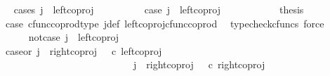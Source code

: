 \begin{isabellebody}
\ \ \isamarkupfalse%
{\isacharparenleft}{\kern0pt}cases\ {\isachardoublequoteopen}j\ {\isacharequal}{\kern0pt}\ left{\isacharunderscore}{\kern0pt}coproj\ {\isasymone}\ {\isacharparenleft}{\kern0pt}{\isasymone}\ {\isasymCoprod}\ {\isasymone}{\isacharparenright}{\kern0pt}{\isachardoublequoteclose}{\isacharparenright}{\kern0pt}\isanewline
\ \ \ \ \isamarkupfalse%
\ case{}{\isacharcolon}{\kern0pt}\ {\isachardoublequoteopen}j\ {\isacharequal}{\kern0pt}\ left{\isacharunderscore}{\kern0pt}coproj\ {\isasymone}\ {\isacharparenleft}{\kern0pt}{\isasymone}\ {\isasymCoprod}\ {\isasymone}{\isacharparenright}{\kern0pt}{\isachardoublequoteclose}\isanewline
\ \ \ \ \isamarkupfalse%
\ \isamarkupfalse%
\ {\isacharquery}{\kern0pt}thesis\isanewline
\ \ \ \ \ \ \isamarkupfalse%
\ case{}\ cfunc{\isacharunderscore}{\kern0pt}coprod{\isacharunderscore}{\kern0pt}type\ j{\isacharunderscore}{\kern0pt}def\ left{\isacharunderscore}{\kern0pt}coproj{\isacharunderscore}{\kern0pt}cfunc{\isacharunderscore}{\kern0pt}coprod\ \isamarkupfalse%
\ {\isacharparenleft}{\kern0pt}typecheck{\isacharunderscore}{\kern0pt}cfuncs{\isacharcomma}{\kern0pt}\ force{\isacharparenright}{\kern0pt}\isanewline
\ \ \isamarkupfalse%
\isanewline
\ \ \ \ \isamarkupfalse%
\ not{\isacharunderscore}{\kern0pt}case{}{\isacharcolon}{\kern0pt}\ {\isachardoublequoteopen}j\ {\isasymnoteq}\ left{\isacharunderscore}{\kern0pt}coproj\ {\isasymone}\ {\isacharparenleft}{\kern0pt}{\isasymone}\ {\isasymCoprod}\ {\isasymone}{\isacharparenright}{\kern0pt}{\isachardoublequoteclose}\isanewline
\ \ \ \ \isamarkupfalse%
\ \isamarkupfalse%
\ case{}{\isacharunderscore}{\kern0pt}or{\isacharunderscore}{\kern0pt}{}{\isacharcolon}{\kern0pt}\ {\isachardoublequoteopen}j\ {\isacharequal}{\kern0pt}\ right{\isacharunderscore}{\kern0pt}coproj\ {\isasymone}\ {\isacharparenleft}{\kern0pt}{\isasymone}{\isasymCoprod}{\isasymone}{\isacharparenright}{\kern0pt}\ {\isasymcirc}\isactrlsub c\ left{\isacharunderscore}{\kern0pt}coproj\ {\isasymone}\ {\isasymone}\ \ \ {\isasymor}\ \isanewline
\ \ \ \ \ \ \ \ \ \ \ \ \ \ \ \ \ \ \ \ \ \ \ \ \ \ \ j\ {\isacharequal}{\kern0pt}\ right{\isacharunderscore}{\kern0pt}coproj\ {\isasymone}\ {\isacharparenleft}{\kern0pt}{\isasymone}{\isasymCoprod}{\isasymone}{\isacharparenright}{\kern0pt}\ {\isasymcirc}\isactrlsub c\ right{\isacharunderscore}{\kern0pt}coproj\ {\isasymone}\ {\isasymone}{\isachardoublequoteclose}\isanewline

\end{isabellebody}
